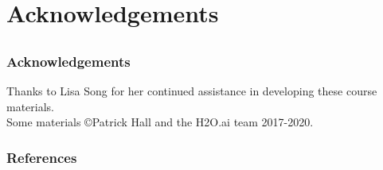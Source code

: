 \documentclass[11pt,
               aspectratio=169,
               hyperref={colorlinks}
               ]{beamer}
\begin{document}
\section{Acknowledgements}

\subsection*{}

\begin{frame}
	
	\frametitle{Acknowledgements}
			
	Thanks to Lisa Song for her continued assistance in developing these course materials.\\
	\vspace{10pt}
	Some materials \copyright\hspace{1pt}Patrick Hall and the H2O.ai team 2017-2020.  
	
\end{frame}	


	\begin{frame}[t, allowframebreaks]
	
		\frametitle{References}		
		
		\printbibliography
		
	\end{frame}
\end{document}
